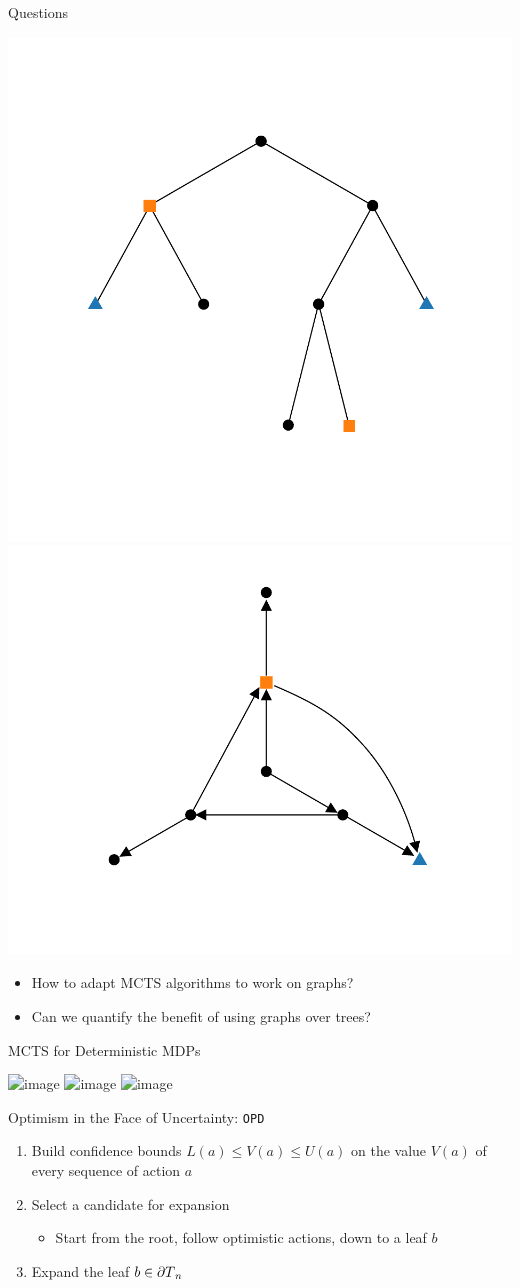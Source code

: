 \documentclass[slideopt,A4,showboxes,svgnames]{beamer}
\begin{document}
\begin{frame}{Questions}
\begin{center}
	\includegraphics[trim={1.8cm 2.2cm 1.9cm 2.7cm}, clip,width=0.46\linewidth]{img/tree_simple}
	\includegraphics[trim={1.8cm 1.2cm 1.9cm 0.8cm}, clip,width=0.46\linewidth]{img/graph_simple}
\end{center}
\begin{itemize}
	\item How to \alert{adapt} MCTS algorithms to work on graphs?
	\item Can we \alert{quantify} the benefit of using graphs over trees?
\end{itemize}
\end{frame}

\begin{frame}{MCTS for Deterministic MDPs}
\begin{center}
	\includegraphics<1-3>[trim={1.8cm 1.5cm 1.9cm 2.7cm}, clip,width=0.35\linewidth]{../img/tree_1}%
	\includegraphics<4>[trim={1.8cm 1.5cm 1.9cm 2.7cm}, clip,width=0.35\linewidth]{img/tree_sample}%
	\includegraphics<5>[trim={1.8cm 1.5cm 1.9cm 2.7cm}, clip,width=0.35\linewidth]{img/tree_expand}%
\end{center}
\vspace*{-0.5cm}
\begin{block}{Optimism in the Face of Uncertainty: \texttt{OPD}}
\pause
\begin{enumerate}[<+->]
	\item Build \alert{confidence bounds} $L(a)\leq V(a) \leq U(a)$ on the value $V(a)$ of every sequence of action $a$
	\item Select a candidate for expansion \begin{itemize}
		\item Start from the root, follow \alert{optimistic} actions, down to a leaf $b$
	\end{itemize}
	\item \alert{Expand} the leaf $b\in{\partial T}_n$
\end{enumerate}
\end{block}
\end{frame}
\end{document}
